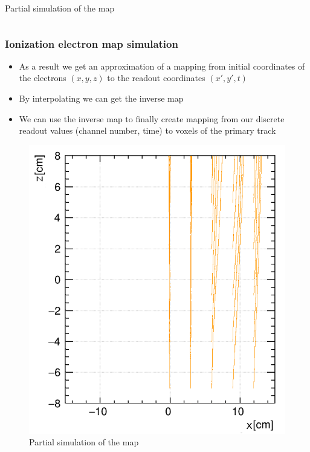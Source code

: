 \documentclass{beamer}
\begin{document}
\begin{frame}
\begin{columns}
\begin{minipage}[t][4.2cm]{\textwidth}
				\end{minipage}
				{Partial simulation of the map}
		\end{columns}
	\end{frame}

	\begin{frame}
		\frametitle{Ionization electron map simulation}
		\begin{itemize}
			\item As a result we get an approximation of a mapping from initial coordinates of the electrons $(x,y,z)$ to the readout coordinates $(x',y',t)$
			\item By interpolating we can get the inverse map
			\item We can use the inverse map to finally create mapping from our discrete readout values (channel number, time) to voxels of the primary track
		\end{itemize}
		\begin{figure}
			\centering
			\includegraphics[height=0.4\textheight]{../images/map_lines_flipped.png}\\
			\small{Partial simulation of the map}
		\end{figure}
	\end{frame}
\end{document}
